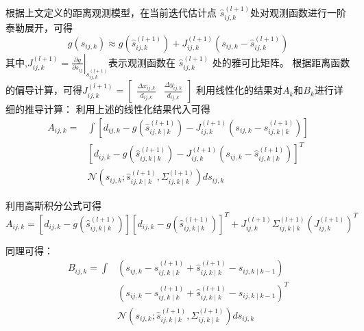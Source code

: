 根据上文定义的距离观测模型，在当前迭代估计点 $\hat{s}_{i j, k}^{(l+1)}$处对观测函数进行一阶泰勒展开，可得
\begin{equation}
g\left(s_{i j, k}\right) \approx g\left(\hat{s}_{i j, k}^{(l+1)}\right)+J_{i j, k}^{(l+1)}\left(s_{i j, k}-\hat{s}_{i j, k}^{(l+1)}\right)
\end{equation}
其中,$J_{i j, k}^{(l+1)}=\left.\frac{\partial g}{\partial s_{i j}}\right|_{\hat{s}_{i j, k}^{(l+1)}}$表示观测函数在  $\hat{s}_{i j, k}^{(l+1)}$  处的雅可比矩阵。
根据距离函数的偏导计算，可得$J_{i j, k}^{(l+1)}=\left[\begin{array}{ll}
\frac{\Delta x_{i j, k}}{d_{i j, k}} & \frac{\Delta y_{i j, k}}{d_{i j, k}}
\end{array}\right]$
利用线性化的结果对$A_{k} $和$B_{k}$进行详细的推导计算：
利用上述的线性化结果代入可得
\begin{equation}
\begin{aligned}
A_{i j, k}= & \int\left[d_{i j, k}-g\left(\hat{s}_{i j, k \mid k}^{(l+1)}\right)-J_{i j, k}^{(l+1)}\left(s_{i j, k}-\hat{s}_{i j, k \mid k}^{(l+1)}\right)\right] \\
& {\left[d_{i j, k}-g\left(\hat{s}_{i j, k \mid k}^{(l+1)}\right)-J_{i j, k}^{(l+1)}\left(s_{i j, k}-\hat{s}_{i j, k \mid k}^{(l+1)}\right)\right]^{T} } \\
& \mathcal{N}\left(s_{i j, k} ; \hat{s}_{i j, k \mid k}^{(l+1)}, \Sigma_{i j, k \mid k}^{(l+1)}\right) d s_{i j, k}
\end{aligned}
\end{equation}

利用高斯积分公式可得
\begin{equation}
A_{i j, k}=\left[d_{i j, k}-g\left(\hat{s}_{i j, k \mid k}^{(l+1)}\right)\right]\left[d_{i j, k}-g\left(\hat{s}_{i j, k \mid k}^{(l+1)}\right)\right]^{T}+J_{i j, k}^{(l+1)} \Sigma_{i j, k \mid k}^{(l+1)}\left(J_{i j, k}^{(l+1)}\right)^{T}
\end{equation}

同理可得：
\begin{equation}
\begin{aligned}
B_{i j, k}=\int & \left(s_{i j, k}-\hat{s}_{i j, k \mid k}^{(l+1)}+\hat{s}_{i j, k \mid k}^{(l+1)}-\hat{s}_{i j, k \mid k-1}\right) \\
& \left(s_{i j, k}-\hat{s}_{i j, k \mid k}^{(l+1)}+\hat{s}_{i j, k \mid k}^{(l+1)}-\hat{s}_{i j, k \mid k-1}\right)^{T} \\
& \mathcal{N}\left(s_{i j, k} ; \hat{s}_{i j, k \mid k}^{(l+1)}, \Sigma_{i j, k \mid k}^{(l+1)}\right) d s_{i j, k}
\end{aligned}
\end{equation}

